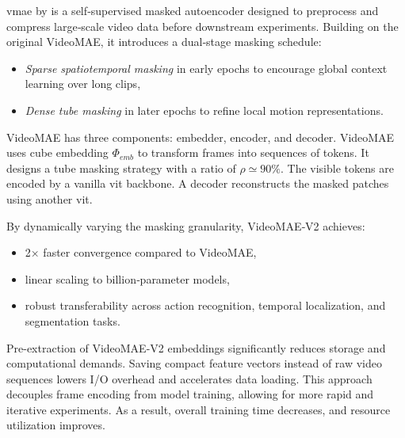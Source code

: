 \acrfull{vmae} by \textcite{wang_videomae_2023} is a self‑supervised masked autoencoder designed to preprocess and compress large‑scale video data before downstream experiments. Building on the original VideoMAE, it introduces a dual‑stage masking schedule: 

\begin{itemize}
    \item \emph{Sparse spatiotemporal masking} in early epochs to encourage global context learning over long clips,
    \item \emph{Dense tube masking} in later epochs to refine local motion representations.
\end{itemize}

VideoMAE has three components: embedder, encoder, and decoder. VideoMAE uses cube embedding \(\Phi_{emb}\) to transform frames into sequences of tokens. It designs a tube masking strategy with a ratio of \(\rho \simeq 90\%\). The visible tokens are encoded by a vanilla \acrshort{vit} backbone. A decoder reconstructs the masked patches using another \acrshort{vit}\cite{wang_videomae_2023}. 

By dynamically varying the masking granularity, VideoMAE‑V2 achieves:
\begin{itemize}
    \item 2× faster convergence compared to VideoMAE,
    \item linear scaling to billion‑parameter models,
    \item robust transferability across action recognition, temporal localization, and segmentation tasks\cite{wang_videomae_2023}.
\end{itemize}

Pre-extraction of VideoMAE-V2 embeddings significantly reduces storage and computational demands. Saving compact feature vectors instead of raw video sequences lowers I/O overhead and accelerates data loading. This approach decouples frame encoding from model training, allowing for more rapid and iterative experiments. As a result, overall training time decreases, and resource utilization improves. 

